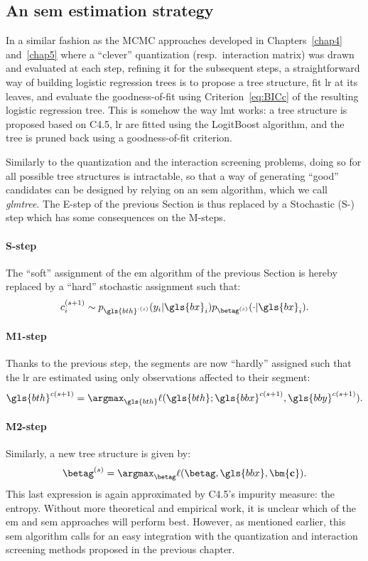 \subsection{An \gls{sem} estimation strategy} \label{subsec:sem}

In a similar fashion as the MCMC approaches developed in Chapters~\ref{chap4} and~\ref{chap5} where a ``clever'' quantization (resp.\ interaction matrix) was drawn and evaluated at each step, refining it for the subsequent steps, a straightforward way of building logistic regression trees is to propose a tree structure, fit \gls{lr} at its leaves, and evaluate the goodness-of-fit using Criterion~\ref{eq:BICc} of the resulting logistic regression tree. This is somehow the way \gls{lmt} works: a tree structure is proposed based on C4.5, \gls{lr} are fitted using the LogitBoost algorithm, and the tree is pruned back using a goodness-of-fit criterion.

Similarly to the quantization and the interaction screening problems, doing so for all possible tree structures is intractable, so that a way of generating ``good'' candidates can be designed by relying on an \gls{sem} algorithm, which we call \textit{glmtree}. The E-step of the previous Section is thus replaced by a Stochastic (S-) step which has some consequences on the M-steps.
\paragraph{S-step} The ``soft'' assignment of the \gls{em} algorithm of the previous Section is hereby replaced by a ``hard'' stochastic assignment such that:
\[ c_i^{(s+1)} \sim p_{\gls{bth}^{\cdot(s)}}(y_i | \gls{bx}_i) p_{\betag^{(s)}}(\cdot | \gls{bx}_i). \]
\paragraph{M1-step} Thanks to the previous step, the segments are now ``hardly'' assigned such that the \gls{lr} are estimated using only observations affected to their segment:
\[ \gls{bth}^{c(s+1)} = \argmax_{\gls{bth}} \ell(\gls{bth};\gls{bbx}^{c(s+1)},\gls{bby}^{c(s+1)}). \]
\paragraph{M2-step} Similarly, a new tree structure is given by:
\[ \betag^{(s)} = \argmax_{\betag} \ell(\betag, \gls{bbx}, \mathbf{\bm{c}}). \]
This last expression is again approximated by C4.5's impurity measure: the entropy. Without more theoretical and empirical work, it is unclear which of the \gls{em} and \gls{sem} approaches will perform best. However, as mentioned earlier, this \gls{sem} algorithm calls for an easy integration with the quantization and interaction screening methods proposed in the previous chapter.

